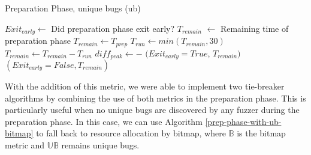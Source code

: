 %
%
\begin{algorithm}[h!]
  \caption{Preparation Phase, unique bugs (ub)}\label{prep-phase-with-ub}
  \small
  \begin{algorithmic}[1]
    \Output
      \State $Exit_{early} \gets$ Did preparation phase exit early?
      \State $T_{remain}$ $\gets$ Remaining time of preparation phase
    \EndOutput
      \State $T_{remain} \gets T_{prep}$
        \State $T_{run} \gets min(T_{remain},30)$
            \State {}
          \EndFor
        \Else {}
          \State {}
        \EndIf
        \State $T_{remain} \gets T_{remain} - T_{run}$
        \State $diff_{peak} \gets $$ - $
          \State \Return $(Exit_{early}=True$, $T_{remain})$
        \EndIf
      \EndWhile
      \State \Return $(Exit_{early}=False, T_{remain})$
    \EndFunction
  \end{algorithmic}
\end{algorithm}

With the addition of this metric, we were able to implement two tie-breaker algorithms 
by combining the use of both metrics in the preparation phase. This is particularly 
useful when no unique bugs are discovered by any fuzzer during the preparation phase. 
In this case, we can use Algorithm \ref{prep-phase-with-ub-bitmap} to fall back to 
resource allocation by bitmap, where $\mathbb{B}$ is the bitmap metric and $\mathbb{UB}$ 
remains unique bugs.

